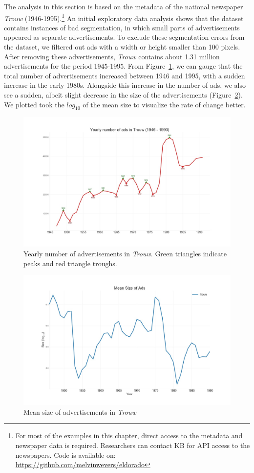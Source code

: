 \documentclass[USenglish]{article}
\begin{document}
The analysis in this section is based on the metadata of the national newspaper \textit{Trouw} (1946-1995).\footnote{For most of the examples in this chapter, direct access to the metadata and newspaper data is required. Researchers can contact KB for API access to the newspapers. Code is available on: \url{https://github.com/melvinwevers/eldorado}} An initial exploratory data analysis shows that the dataset contains instances of bad segmentation, in which small parts of advertisements appeared as separate advertisements. To exclude these segmentation errors from the dataset, we filtered out ads with a width or height smaller than 100 pixels. After removing these advertisements, \textit{Trouw} contains about 1.31 million advertisements for the period 1945-1995. From Figure~\ref{fig:ad_curve}, we can gauge that the total number of advertisements increased between 1946 and 1995, with a sudden increase in the early 1980s. Alongside this increase in the number of ads, we also see a sudden, albeit slight decrease in the size of the advertisements (Figure~\ref{fig:mean_size}). We plotted took the $log_{10}$ of the mean size to visualize the rate of change better. 

\begin{figure}%
  \centering
  \includegraphics[width=.9\textwidth]{figures/Trouw_ad_curve}%
  \caption{Yearly number of advertisements in \textit{Trouw}. Green triangles indicate peaks and red triangle troughs.}%
  \label{fig:ad_curve}%
\end{figure}

\begin{figure}%
  \centering
  \includegraphics[width=.9\textwidth]{figures/mean_size}%
  \caption{Mean size of advertisements in \textit{Trouw}}
  \label{fig:mean_size}%
\end{figure}
\end{document}
